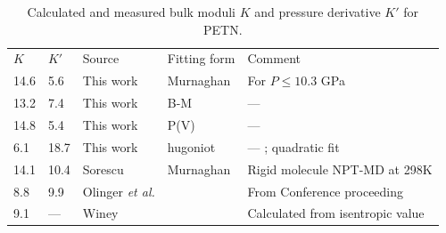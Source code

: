 \documentclass[prb,aps,nobibnotes,twocolumn,doublespace,twocolumngrid,superbib]{revtex4}
\begin{document}
\begin{table}[p]
\begin{center}
\begin{tabular}{lllll}
\hline\hline
$K$ &   $K'$   &   Source  &    Fitting form &      Comment \\
14.6 & 5.6  &  This work &  Murnaghan    &      For $ P \le 10.3 $ GPa \\
13.2 & 7.4  &  This work &  B-M       &                --- \\
14.8 & 5.4  &  This work &  P(V)    &                  --- \\
 6.1 &18.7  &  This work &  hugoniot  &                --- ; quadratic fit \\
14.1 &10.4  &  Sorescu   &  Murnaghan &         Rigid molecule NPT-MD at 298K \\
 8.8 & 9.9 &   Olinger {\it et al.}& &              From Conference proceeding \\
 9.1 & --- &   Winey     &     &             Calculated from isentropic value \\
\hline\hline
\end{tabular}
\end{center}
\caption{Calculated and measured bulk moduli $K$ and pressure
derivative $K'$ for PETN.
}
\label{tab:table3}
\end{table}

 
\end{document}
